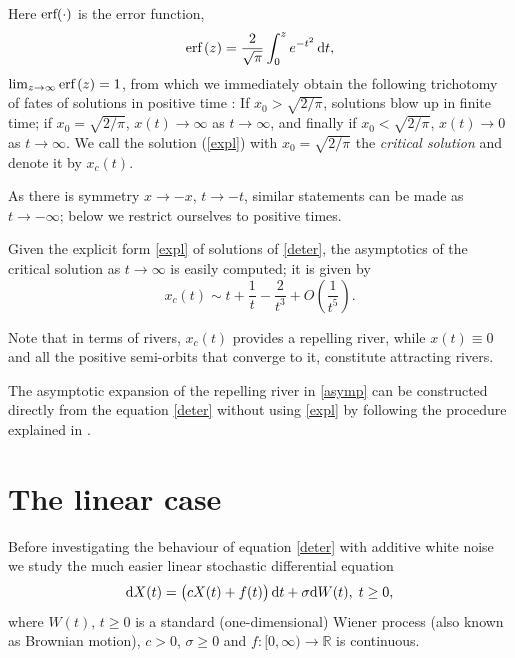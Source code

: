 \documentclass[sn-mathphys-num]{sn-jnl}
\theoremstyle{definition}
\newcommand{\scr}[1]{\mathscr #1}
\numberwithin{equation}{section} \theoremstyle{remark}
\renewcommand{\d}{\hbox{d}}
\def\R{\mathbb R}
\def\d{\text{\rm{d}}} \def\bb{\beta} \def\aa{\alpha} \def\D{\scr D}
\newcommand{\1}{\mathbbm{1}}
\begin{document}
Here $\hbox{erf}(\cdot)$ is the error function,
\[
  \hbox{erf}\, (z) = \frac{2}{\sqrt{\pi}} \int_0^z e^{-t^2} \, \d t,
\]
$\lim_{z \rightarrow \infty} \hbox{erf}\, (z) = 1$, from which we
immediately obtain the following trichotomy of fates of solutions in
positive time : If $x_0> \sqrt{2/\pi}$, solutions blow up in finite
time; if $x_0= \sqrt{2/\pi}$, $x(t) \rightarrow \infty$ as
$t \rightarrow \infty$, and finally if $x_0< \sqrt{2/\pi}$,
$x(t) \rightarrow 0$ as $t \rightarrow \infty$. We call the solution
(\ref{expl}) with $x_0= \sqrt{2/\pi}$ the \emph{critical solution} and
denote it by $x_c(t)$.

As there is symmetry $x\rightarrow -x$, $t\rightarrow -t$, similar
statements can be made as $t \rightarrow  -\infty$; below we restrict
ourselves to positive times. 

Given the explicit form \eqref{expl} of solutions of \eqref{deter},
the asymptotics of the critical solution as $t \rightarrow \infty$ is
easily computed; it is given by
\begin{equation}\label{asymp}
 x_c(t) \sim   t + \frac{1}{t} - \frac{2}{t^3} + O\left(\frac{1}{t^5}\right).
 \end{equation}

 Note that in terms of rivers, $x_c(t)$ provides a repelling river,
 while $x(t) \equiv 0$ and all the positive semi-orbits that converge
 to it, constitute attracting rivers.
 

The asymptotic expansion of the repelling river in \eqref{asymp} can
be constructed directly from the equation \eqref{deter} without using
\eqref{expl} by following the procedure explained in \cite{Blais}.


\section{The linear case}

Before investigating the behaviour of equation \eqref{deter} with
additive white noise we study the much easier linear stochastic
differential equation
\begin{equation} \label{lin}
\d X(t)=\big(cX(t)+f(t)\big)\,\d t + \sigma \d W(t),\;t \geq 0,
\end{equation}
where $W(t),\,t \geq 0$ is a standard (one-dimensional) Wiener process (also known as Brownian motion), $c>0$, $\sigma \geq 0$ and $f:[0,\infty)\to \R$ is continuous.
\end{document}
